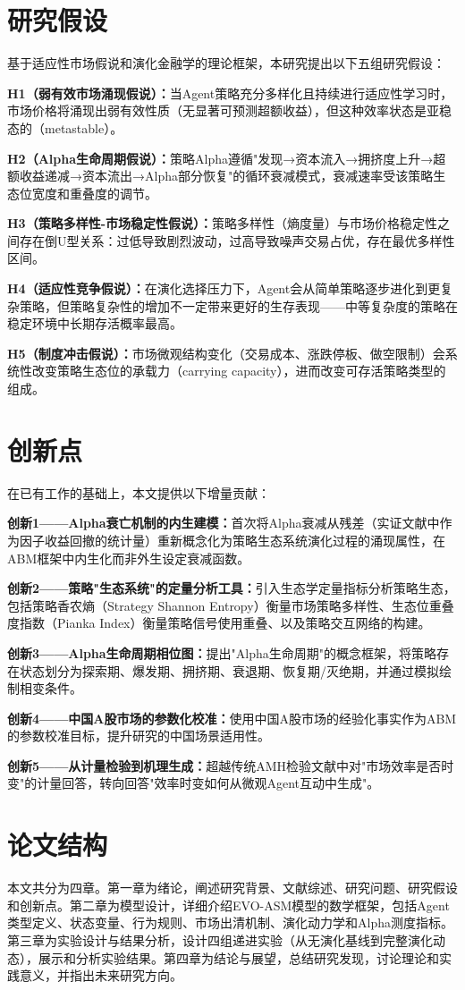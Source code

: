 \section{研究假设}

基于适应性市场假说和演化金融学的理论框架，本研究提出以下五组研究假设：

\textbf{H1（弱有效市场涌现假说）：}当Agent策略充分多样化且持续进行适应性学习时，市场价格将涌现出弱有效性质（无显著可预测超额收益），但这种效率状态是亚稳态的（metastable）。

\textbf{H2（Alpha生命周期假说）：}策略Alpha遵循"发现→资本流入→拥挤度上升→超额收益递减→资本流出→Alpha部分恢复"的循环衰减模式，衰减速率受该策略生态位宽度和重叠度的调节。

\textbf{H3（策略多样性-市场稳定性假说）：}策略多样性（熵度量）与市场价格稳定性之间存在倒U型关系：过低导致剧烈波动，过高导致噪声交易占优，存在最优多样性区间。

\textbf{H4（适应性竞争假说）：}在演化选择压力下，Agent会从简单策略逐步进化到更复杂策略，但策略复杂性的增加不一定带来更好的生存表现——中等复杂度的策略在稳定环境中长期存活概率最高。

\textbf{H5（制度冲击假说）：}市场微观结构变化（交易成本、涨跌停板、做空限制）会系统性改变策略生态位的承载力（carrying capacity），进而改变可存活策略类型的组成。

\section{创新点}

在已有工作的基础上，本文提供以下增量贡献：

\textbf{创新1——Alpha衰亡机制的内生建模：}首次将Alpha衰减从残差（实证文献中作为因子收益回撤的统计量）重新概念化为策略生态系统演化过程的涌现属性，在ABM框架中内生化而非外生设定衰减函数。

\textbf{创新2——策略"生态系统"的定量分析工具：}引入生态学定量指标分析策略生态，包括策略香农熵（Strategy Shannon Entropy）衡量市场策略多样性、生态位重叠度指数（Pianka Index）衡量策略信号使用重叠、以及策略交互网络的构建。

\textbf{创新3——Alpha生命周期相位图：}提出"Alpha生命周期"的概念框架，将策略存在状态划分为探索期、爆发期、拥挤期、衰退期、恢复期/灭绝期，并通过模拟绘制相变条件。

\textbf{创新4——中国A股市场的参数化校准：}使用中国A股市场的经验化事实作为ABM的参数校准目标，提升研究的中国场景适用性。

\textbf{创新5——从计量检验到机理生成：}超越传统AMH检验文献中对"市场效率是否时变"的计量回答，转向回答"效率时变如何从微观Agent互动中生成"。

\section{论文结构}

本文共分为四章。第一章为绪论，阐述研究背景、文献综述、研究问题、研究假设和创新点。第二章为模型设计，详细介绍EVO-ASM模型的数学框架，包括Agent类型定义、状态变量、行为规则、市场出清机制、演化动力学和Alpha测度指标。第三章为实验设计与结果分析，设计四组递进实验（从无演化基线到完整演化动态），展示和分析实验结果。第四章为结论与展望，总结研究发现，讨论理论和实践意义，并指出未来研究方向。
